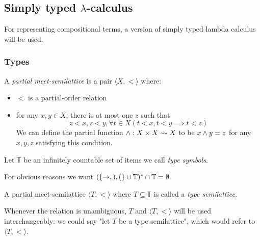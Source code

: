 \documentclass[main.tex]{subfiles}
\begin{document}
\subsection{Simply typed $\lambda$-calculus}
\label{sec:lambda}

For representing compositional terms, a version of simply typed lambda calculus
will be used.

\subsubsection{Types}
\begin{defn}
    A \emph{partial meet-semilattice} is a pair $\langle X, \less \rangle$ where:
    \begin{itemize}
        \item $\less$ is a partial-order relation
        \item for any $x, y \in X$, there is at most one $z$ such that
        \[  z \less x, z \less y,
            \forall t \in X (t \less x, t \less y \implies t \less z) \]
        We can define the partial function $\wedge : X \times X \leadsto X$ to
        be $x \wedge y = z$ for any $x, y, z$ satisfying this condition.
    \end{itemize}
\end{defn}

\begin{defn}
    Let $\mathbb{T}$ be an infinitely countable set of items we call
    \emph{type symbols}.

    For obvious reasons we want $(\{ \rightarrow, ), ( \} \cup \mathbb{T})^*
    \cap \mathbb{T} = \emptyset$.
\end{defn}

\begin{defn}
    A partial meet-semilattice $\langle T, \less \rangle$ where
    $T \subseteq \mathbb{T}$ is called a \emph{type semilattice}.

    Whenever the relation is unambiguous, $T$ and $\langle T, \less \rangle$
    will be used interchangeably: we could say "let $T$ be a
    type semilattice", which would refer to $\langle T, \less \rangle$.
\end{defn}
\end{document}
